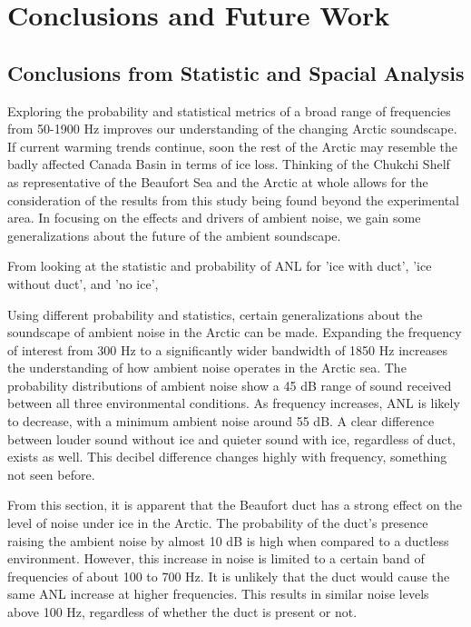 
\chapter{Conclusions and Future Work}

\section{Conclusions from Statistic and Spacial Analysis}

Exploring the probability and statistical metrics of a broad range of frequencies from 50-1900 Hz improves our understanding of the changing Arctic soundscape. If current warming trends continue, soon the rest of the Arctic may resemble the badly affected Canada Basin in terms of ice loss. Thinking of the Chukchi Shelf as representative of the Beaufort Sea and the Arctic at whole allows for the consideration of the results from this study being found beyond the experimental area.  In focusing on the effects and drivers of ambient noise, we gain some generalizations about the future of the ambient soundscape.

From looking at the statistic and probability of ANL for 'ice with duct', 'ice without duct', and 'no ice', 

Using different probability and statistics, certain generalizations about the soundscape of ambient noise in the Arctic can be made. Expanding the frequency of interest from 300 Hz to a significantly wider bandwidth of 1850 Hz increases the understanding of how ambient noise operates in the Arctic sea. The probability distributions of ambient noise show a 45 dB range of sound received between all three environmental conditions. As frequency increases, ANL is likely to decrease, with a minimum ambient noise around 55 dB. A clear difference between louder sound without ice and quieter sound with ice, regardless of duct, exists as well. This decibel difference changes highly with frequency, something not seen before.

From this section, it is apparent that the Beaufort duct has a strong effect on the level of noise under ice in the Arctic. The probability of the duct's presence raising the ambient noise by almost 10 dB is high when compared to a ductless environment. However, this increase in noise is limited to a certain band of frequencies of about 100 to 700 Hz. It is unlikely that the duct would cause the same ANL increase at higher frequencies. This results in similar noise levels above 100 Hz, regardless of whether the duct is present or not.

